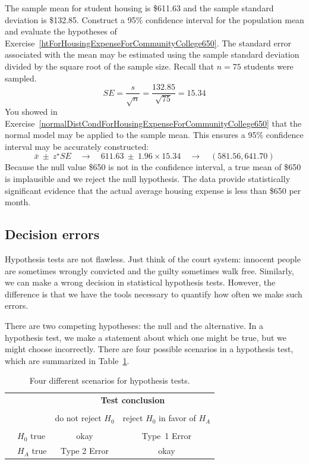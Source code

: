 \begin{example}{The sample mean for student housing is \$611.63 and the sample standard deviation is \$132.85. Construct a 95\% confidence interval for the population mean and evaluate the hypotheses of Exercise~\ref{htForHousingExpenseForCommunityCollege650}.}
The standard error associated with the mean may be estimated using the sample standard deviation divided by the square root of the sample size. Recall that $n=75$ students were sampled.
$$ SE = \frac{s}{\sqrt{n}} = \frac{132.85}{\sqrt{75}} = 15.34 $$
You showed in Exercise~\ref{normalDistCondForHousingExpenseForCommunityCollege650} that the normal model may be applied to the sample mean. This ensures a 95\% confidence interval may be accurately constructed:
$$\bar{x}\ \pm\ z^{\star} SE \quad\to\quad 611.63\ \pm\ 1.96 \times  15.34 \quad \to \quad (581.56, 641.70) $$
Because the null value \$650 is not in the confidence interval, a true mean of \$650 is implausible and we reject the null hypothesis. The data provide statistically significant evidence that the actual average housing expense is less than \$650 per month.
\end{example}

\subsection{Decision errors}


Hypothesis tests are not flawless. Just think of the court system: innocent people are sometimes wrongly convicted and the guilty sometimes walk free. Similarly, we can make a wrong decision in statistical hypothesis tests. However, the difference is that we have the tools necessary to quantify how often we make such errors.

There are two competing hypotheses: the null and the alternative. In a hypothesis test, we make a statement about which one might be true, but we might choose incorrectly. There are four possible scenarios in a hypothesis test, which are summarized in Table~\ref{fourHTScenarios}.

\begin{table}[ht]
\centering
\begin{tabular}{l l c c}
& & \multicolumn{2}{c}{\textbf{Test conclusion}} \\
  \cline{3-4}
\vspace{-3.7mm} \\
& & do not reject $H_0$ &  reject $H_0$ in favor of $H_A$ \\
  \cline{2-4}
\vspace{-3.7mm} \\
& $H_0$ true & okay &  Type~1 Error \\
\raisebox{1.5ex}{\textbf{Truth}} & $H_A$ true & Type 2 Error & okay \\
  \cline{2-4}
\end{tabular}
\caption{Four different scenarios for hypothesis tests.}
\label{fourHTScenarios}
\end{table}

